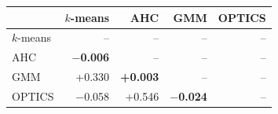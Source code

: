 \begin{tabular}{lrrrr}
\toprule
 & $k$-means & AHC & GMM & OPTICS \\
\midrule
$k$-means & -- & -- & -- & -- \\
AHC & {\bfseries\boldmath $-$0.006} & -- & -- & -- \\
GMM & +0.330 & {\bfseries\boldmath +0.003} & -- & -- \\
OPTICS & $-$0.058 & +0.546 & {\bfseries\boldmath $-$0.024} & -- \\
\bottomrule
\end{tabular}
